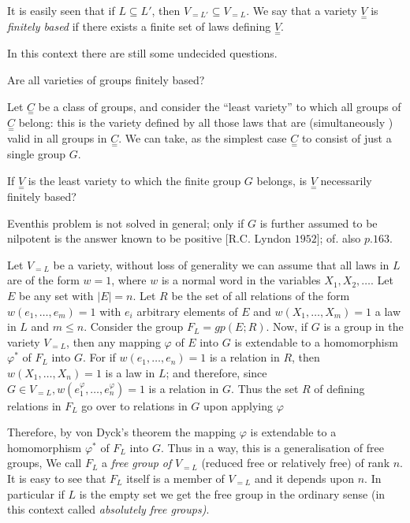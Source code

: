 It is easily seen that if $L \subseteq L'$, then $V_{=L'} \subseteq
V_{=L}$. We say that a variety $\underset{=}V$ is \textit{finitely
  based} if there exists a finite set of laws defining
$\underset{=}V$.  

In this context there are still some undecided questions. 

\begin{prob*}
  Are all varieties of groups finitely based?
\end{prob*}
 
Let $\underset{=}C$ be a class of groups, and consider the ``least
variety'' to which all groups of  $\underset{=}C$ belong: this is the
variety defined by all those laws that are (simultaneously ) valid in
all groups in $\underset{=}C$. We can take, as the simplest case
$\underset{=}C$ to consist of just a single group $G$. 

\begin{prob*}
  If $\underset{=}V$ is the least variety to which the finite group
  $G$ belongs, is $\underset{=}V$ necessarily finitely based?   
\end{prob*}
 
Even\pageoriginale this problem is not solved in general; only if $G$ is further
assumed to be nilpotent is the answer known to be positive
[R.C. Lyndon $1952$]; of. also $p.163$. 

Let $V_{= L}$ be a variety, without loss of generality we can assume
that all laws in $L$ are of the form $w=1$, where $w$ is a normal word
in the variables $X_1,X_2,\ldots $. Let $E$ be any set with
$|E|=n$. Let $R$ be the set of all relations of the form
$w(e_1,\ldots,e_m)=1$ with $e_i$ arbitrary elements of $E$ and $w(X_1,
\ldots, X_m)=1$ a law in $L$ and $m \leq n$. Consider the group $F_L =
gp(E;R)$. Now, if $G$ is a group in the variety $V_{=L}$, then any
mapping $\varphi$ of $E$ into $G$ is extendable to a homomorphism
$\varphi^*$ of $F_L$ into $G$. For if $w(e_1,\ldots,e_n)=1$ is a
relation in $R$, then $w(X_1,\ldots,X_n)=1$ is a law in $L$; and
therefore, since $G \in  V_{=L}, w(e^\varphi_1,
\ldots,e^\varphi_n)=1$ is a relation in $G$. Thus the set $R$ of
defining relations in $F_L$ go over to relations in $G$ upon applying
$\varphi$ 

Therefore, by von Dyck's theorem the mapping $\varphi$ is extendable
to a homomorphism $\varphi^*$ of $F_L$ into $G$. Thus in a way, this
is a generalisation of free groups, We call $F_L$ a \textit{free group
  of} $V_{=L}$ (reduced free or relatively free) of rank $n$. It is
easy to see that $F_L$ itself is a member of $V_{=L}$ and it depends
upon $n$. In particular if $L$ is the empty set we get the free group
in the ordinary sense (in this context called \textit{absolutely free
  groups)}. 


